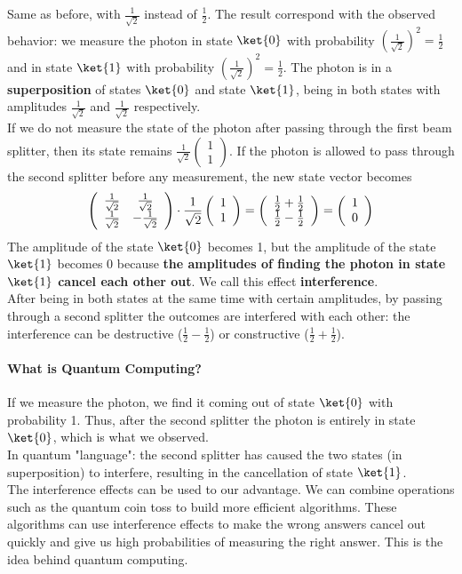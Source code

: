 \documentclass[10pt]{report}
\begin{document}
Same as before, with $\frac{1}{\sqrt{2}}$ instead of $\frac{1}{2}$. The result correspond with the observed behavior: we measure the photon in state $\ket{0}$ with probability $\left(\frac{1}{\sqrt{2}}\right)^2=\frac{1}{2}$ and in state $\ket{1}$ with probability $\left(\frac{1}{\sqrt{2}}\right)^2=\frac{1}{2}$. The photon is in a \textbf{superposition} of states $\ket{0}$ and state $\ket{1}$, being in both states with amplitudes $\frac{1}{\sqrt{2}}$ and $\frac{1}{\sqrt{2}}$ respectively.\\
If we do not measure the state of the photon after passing through the first beam splitter, then its state remains $\frac{1}{\sqrt{2}}\left(\begin{array}{c}
1\\1
\end{array}\right)$. If the photon is allowed to pass through the second splitter before any measurement, the new state vector becomes
$$\left(\begin{array}{c c}
\frac{1}{\sqrt{2}}&\frac{1}{\sqrt{2}}\\\frac{1}{\sqrt{2}}&-\frac{1}{\sqrt{2}}
\end{array}\right)\cdot\frac{1}{\sqrt{2}}\left(\begin{array}{c}
1\\1
\end{array}\right) = \left(\begin{array}{c}
\frac{1}{2} + \frac{1}{2}\\\frac{1}{2}-\frac{1}{2}
\end{array}\right) = \left(\begin{array}{c}
1\\0
\end{array}\right)$$
The amplitude of the state $\ket{0}$ becomes 1, but the amplitude of the state $\ket{1}$ becomes 0 because \textbf{the amplitudes of finding the photon in state $\ket{1}$ cancel each other out}. We call this effect \textbf{interference}.\\
After being in both states at the same time with certain amplitudes, by passing through a second splitter the outcomes are interfered with each other: the interference can be destructive ($\frac{1}{2} - \frac{1}{2}$) or constructive ($\frac{1}{2} + \frac{1}{2}$).
\paragraph{What is Quantum Computing?} If we measure the photon, we find it coming out of state $\ket{0}$ with probability 1. Thus, after the second splitter the photon is entirely in state $\ket{0}$, which is what we observed.\\
In quantum "language": the second splitter has caused the two states (in superposition) to interfere, resulting in the cancellation of state $\ket{1}$.\\
The interference effects can be used to our advantage. We can combine operations such as the quantum coin toss to build more efficient algorithms. These algorithms can use interference effects to make the wrong answers cancel out quickly and give us high probabilities of measuring the right answer. This is the idea behind quantum computing.
\end{document}
